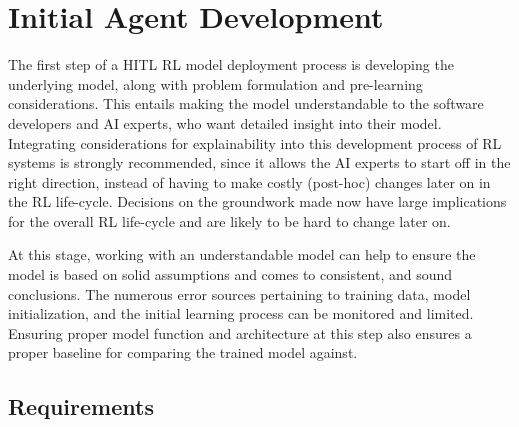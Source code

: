 \documentclass[twoside,11pt]{article}
\begin{document}
\section{Initial Agent Development}
\label{sec:Developing}

The first step of a HITL RL model deployment process is developing the underlying model, along with problem formulation and pre-learning considerations. This entails making the model understandable to the software developers and AI experts, who want detailed insight into their model. 
Integrating considerations for explainability into this development process of RL systems is strongly recommended, since it allows the AI experts to start off in the right direction, instead of having to make costly (post-hoc) changes later on in the RL life-cycle. Decisions on the groundwork made now have large implications for the overall RL life-cycle and are likely to be hard to change later on.

At this stage, working with an understandable model can help to ensure the model is based on solid assumptions and comes to consistent, and sound conclusions. The numerous error sources pertaining to training data, model initialization, and the initial learning process can be monitored and limited. Ensuring proper model function and architecture at this step also ensures a proper baseline for comparing the trained model against.

\subsection{Requirements}
\end{document}
